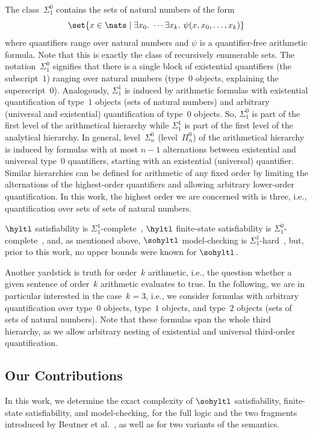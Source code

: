 The class~$\Sigma_1^0$ contains the sets of natural numbers of the form
\[
\set{x \in \nats \mid \exists x_0.\  \cdots \exists x_k.\ \psi(x, x_0, \ldots, x_k)}
\] 
where quantifiers range over natural numbers and $\psi$ is a quantifier-free arithmetic formula. 
Note that this is exactly the class of recursively enumerable sets.
The notation~$\Sigma_1^0$ signifies that there is a single block of existential quantifiers (the subscript~$1$) ranging over natural numbers (type~$0$ objects, explaining the superscript~$0$).
Analogously, $\Sigma_1^1$ is induced by arithmetic formulas with existential quantification of type~$1$ objects (sets of natural numbers) and arbitrary (universal and existential) quantification of type~$0$ objects.
So, $\Sigma_1^0$ is part of the first level of the arithmetical hierarchy while $\Sigma_1^1$ is part of the first level of the analytical hierarchy.
In general, level~$\Sigma_n^0$ (level~$\Pi_n^0$) of the arithmetical hierarchy is induced by formulas with at most $n-1$ alternations between existential and universal type~$0$ quantifiers, starting with an existential (universal) quantifier. 
Similar hierarchies can be defined for arithmetic of any fixed order by limiting the alternations of the highest-order quantifiers and allowing arbitrary lower-order quantification.
In this work, the highest order we are concerned with is three, i.e., quantification over sets of sets of natural numbers.

$\hyltl$ satisfiability is $\Sigma_1^1$-complete~\cite{hyperltlsatconf}, $\hyltl$ finite-state satisfiability is $\Sigma_1^0$-complete~\cite{FinkbeinerH16,hyperltlsat}, and, as mentioned above, $\sohyltl$ model-checking is $\Sigma_1^1$-hard~\cite{DBLP:conf/cav/BeutnerFFM23}, but, prior to this work, no upper bounds were known for $\sohyltl$.


Another yardstick is truth for order~$k$ arithmetic, i.e., the question whether a given sentence of order~$k$ arithmetic evaluates to true. In the following, we are in particular interested in the case~$k=3$, i.e., we consider formulas with arbitrary quantification over type~$0$ objects, type~$1$ objects, and type~$2$ objects (sets of sets of natural numbers). 
Note that these formulas span the whole third hierarchy, as we allow arbitrary nesting of existential and universal third-order quantification.

\subsection{Our Contributions}
In this work, we determine the exact complexity of $\sohyltl$ satisfiability, finite-state satisfiability, and model-checking, for the full logic and the two fragments introduced by Beutner et al.~\cite{DBLP:conf/cav/BeutnerFFM23}, as well as for two variants of the semantics.

